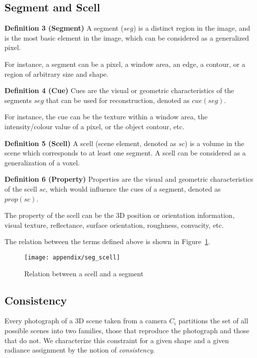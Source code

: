 \subsection{Segment and Scell}
\noindent\textbf{Definition 3 (Segment)} A segment ($seg$) is a distinct region in the image, and is the most basic element in the image, which can be considered as a generalized pixel. 

For instance, a segment can be a pixel, a window area, an edge, a contour, or a region of arbitrary size and shape.

\noindent\textbf{Definition 4 (Cue)} Cues are the visual or geometric characteristics of the segments $seg$ that can be used for reconstruction, denoted as $cue(seg)$.

For instance, the cue can be the texture within a window area, the intensity/colour value of a pixel, or the object contour, etc.

\noindent\textbf{Definition 5 (Scell)} A scell (scene element, denoted as $sc$) is a volume in the scene which corresponds to at least one segment. A scell can be considered as a generalization of a voxel.

\noindent\textbf{Definition 6 (Property)} Properties are the visual and geometric characteristics of the scell $sc$, which would influence the cues of a segment, denoted as $prop(sc)$.

The property of the scell can be the 3D position or orientation information, visual texture, reflectance, surface orientation, roughness, convacity, etc.

The relation between the terms defined above is shown in Figure~\ref{fig:scell_seg}.
\begin{figure}[!htbp]
\centering
\texttt{[image: appendix/seg\_scell]}
\caption{Relation between a scell and a segment}
\label{fig:scell_seg}
\end{figure}


\subsection{Consistency}
Every photograph of a 3D scene taken from a camera $C_i$ partitions the set of all possible scenes into two families, those that reproduce the photograph and those that do not. We characterize this constraint for a given shape and a given radiance assignment by the notion of \textit{consistency}.

